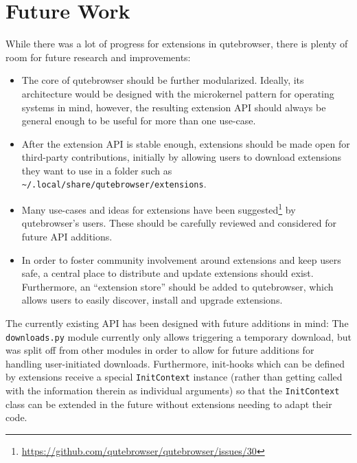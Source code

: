 \section{Future Work}
While there was a lot of progress for extensions in qutebrowser, there is plenty
of room for future research and improvements:

\begin{itemize}
  \item The core of qutebrowser should be further modularized. Ideally, its
    architecture would be designed with the microkernel pattern \autocite[171ff]{posa1}
    for operating systems in mind, however, the resulting extension API should
    always be general enough to be useful for more than one use-case.
  \item After the extension API is stable enough, extensions should be made open
    for third-party contributions, initially by allowing users to download
    extensions they want to use in a folder such as
    \verb|~/.local/share/qutebrowser/extensions|.
  \item Many use-cases and ideas for extensions have been
    suggested\footnote{\url{https://github.com/qutebrowser/qutebrowser/issues/30}}
    by qutebrowser's users. These should be carefully reviewed and considered
    for future API additions.
  \item In order to foster community involvement around extensions and keep
    users safe, a central place to distribute and update extensions should
    exist. Furthermore, an ``extension store'' should be added to qutebrowser,
    which allows users to easily discover, install and upgrade extensions.
\end{itemize}

The currently existing API has been designed with future additions in mind: The
\verb|downloads.py| module currently only allows triggering a temporary
download, but was split off from other modules in order to allow for future
additions for handling user-initiated downloads. Furthermore, init-hooks which
can be defined by extensions receive a special \verb|InitContext| instance
(rather than getting called with the information therein as individual
arguments) so that the \verb|InitContext| class can be extended in the future
without extensions needing to adapt their code.

